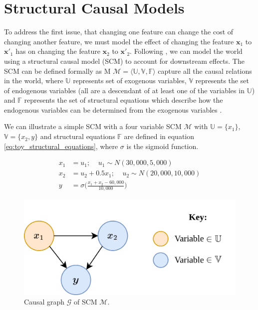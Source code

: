 \section{Structural Causal Models}

To address the first issue, that changing one feature can change the cost of changing another feature, we must model the effect of changing the feature $\mathbf{x}_1$ to $\mathbf{x'}_1$ has on changing the feature $\mathbf{x}_2$ to $\mathbf{x'}_2$. Following \textcite{karimiAlgorithmicRecourseCounterfactual2021}, we can model the world using a structural causal model (SCM) to account for downstream effects. The SCM can be defined formally as M $\mathcal{M} = \langle\mathbb{U, V, F}\rangle$ capture all the causal relations in the world, where $\mathbb{U}$ represents set of exogenous variables, $\mathbb{V}$ represents the set of endogenous variables (all are a descendant of at least one of the variables in $\mathbb{U}$) and $\mathbb{F}$ represents the set of structural equations which describe how the endogenous variables can be determined from the exogenous variables \citep{pearl2016causal}.

We can illustrate a simple SCM with a four variable SCM $\mathcal{M}$ with $\mathbb{U} = \{x_1\}$, $\mathbb{V} = \{x_2, y\}$ and structural equations $\mathbb{F}$ are defined in equation \ref{eq:toy_structural_equations}, where $\sigma$ is the sigmoid function. 

\begin{align} \label{eq:toy_structural_equations}
	x_1 & = u_1; \;\;\;\; u_1 \sim N(30,000 , 5,000) \\ \nonumber
	x_2 & = u_2 + 0.5x_1; \;\;\;\; u_2 \sim N(20,000, 10,000) \\ \nonumber
	y & = \sigma \bigg(\frac{x_1 + x_2 - 60,000}{10,000} \bigg) \nonumber
\end{align}


\begin{figure}[!htb]
	\centering
	\includegraphics[width=0.6\linewidth]{images/draw.io/Simple SCM.png}
	\caption{Causal graph $\mathcal{G}$ of SCM $\mathcal{M}$.}
	\label{fig:toy_scm}
\end{figure}



